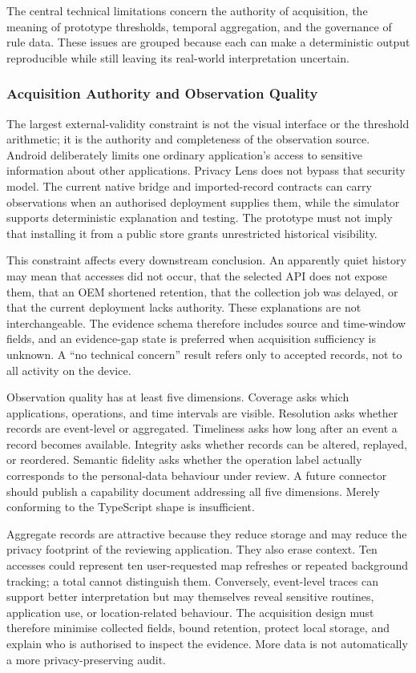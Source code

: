 The central technical limitations concern the authority of acquisition, the meaning of prototype thresholds, temporal aggregation, and the governance of rule data. These issues are grouped because each can make a deterministic output reproducible while still leaving its real-world interpretation uncertain.

\subsubsection{Acquisition Authority and Observation Quality}

The largest external-validity constraint is not the visual interface or the threshold arithmetic; it is the authority and completeness of the observation source. Android deliberately limits one ordinary application's access to sensitive information about other applications. Privacy Lens does not bypass that security model. The current native bridge and imported-record contracts can carry observations when an authorised deployment supplies them, while the simulator supports deterministic explanation and testing. The prototype must not imply that installing it from a public store grants unrestricted historical visibility.

This constraint affects every downstream conclusion. An apparently quiet history may mean that accesses did not occur, that the selected API does not expose them, that an OEM shortened retention, that the collection job was delayed, or that the current deployment lacks authority. These explanations are not interchangeable. The evidence schema therefore includes source and time-window fields, and an evidence-gap state is preferred when acquisition sufficiency is unknown. A ``no technical concern'' result refers only to accepted records, not to all activity on the device.

Observation quality has at least five dimensions. Coverage asks which applications, operations, and time intervals are visible. Resolution asks whether records are event-level or aggregated. Timeliness asks how long after an event a record becomes available. Integrity asks whether records can be altered, replayed, or reordered. Semantic fidelity asks whether the operation label actually corresponds to the personal-data behaviour under review. A future connector should publish a capability document addressing all five dimensions. Merely conforming to the TypeScript shape is insufficient.

Aggregate records are attractive because they reduce storage and may reduce the privacy footprint of the reviewing application. They also erase context. Ten accesses could represent ten user-requested map refreshes or repeated background tracking; a total cannot distinguish them. Conversely, event-level traces can support better interpretation but may themselves reveal sensitive routines, application use, or location-related behaviour. The acquisition design must therefore minimise collected fields, bound retention, protect local storage, and explain who is authorised to inspect the evidence. More data is not automatically a more privacy-preserving audit.

